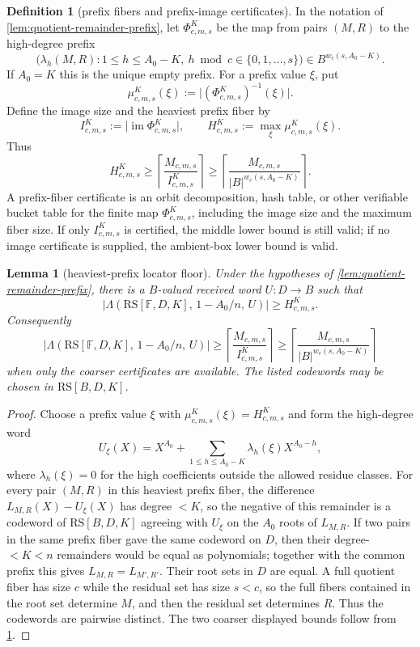 \documentclass[11pt]{article}
\newtheorem{lemma}[lemma]{Lemma}
\theoremstyle{definition}
\newtheorem{definition}[definition]{Definition}
\theoremstyle{remark}
\newcommand{\F}{\mathbb{F}}
\newcommand{\B}{B}
\newcommand{\RS}{\mathrm{RS}}
\newcommand{\Lst}{\Lambda}
\begin{document}
\begin{definition}[prefix fibers and prefix-image certificates]
\label{def:prefix-fiber-certificate}
In the notation of \cref{lem:quotient-remainder-prefix}, let
$\Phi_{c,m,s}^{K}$ be the map from pairs $(M,R)$ to the high-degree prefix
\[
        \bigl(\lambda_h(M,R):1\le h\le A_0-K,
              \ h\bmod c\in\{0,1,\ldots,s\}\bigr)
        \in \B^{w_c(s,A_0-K)} .
\]
If $A_0=K$ this is the unique empty prefix.  For a prefix value $\xi$, put
\[
        \mu_{c,m,s}^{K}(\xi)
        :=\bigl| (\Phi_{c,m,s}^{K})^{-1}(\xi)\bigr|.
\]
Define the image size and the heaviest prefix fiber by
\[
        I_{c,m,s}^{K}:=\bigl|\operatorname{im}\Phi_{c,m,s}^{K}\bigr|,
        \qquad
        H_{c,m,s}^{K}:=\max_{\xi}\mu_{c,m,s}^{K}(\xi).
\]
Thus
\[
        H_{c,m,s}^{K}
        \ge
        \left\lceil\frac{M_{c,m,s}}{I_{c,m,s}^{K}}\right\rceil
        \ge
        \left\lceil\frac{M_{c,m,s}}{|\B|^{w_c(s,A_0-K)}}\right\rceil .
\]
A prefix-fiber certificate is an orbit decomposition, hash table, or other
verifiable bucket table for the finite map $\Phi_{c,m,s}^{K}$, including the
image size and the maximum fiber size.  If only $I_{c,m,s}^{K}$ is certified,
the middle lower bound is still valid; if no image certificate is supplied, the
ambient-box lower bound is valid.
\end{definition}

\begin{lemma}[heaviest-prefix locator floor]
\label{lem:heaviest-prefix-locator-floor}
Under the hypotheses of \cref{lem:quotient-remainder-prefix}, there is a
$\B$-valued received word $U:D\to\B$ such that
\[
        \bigl|\Lst(\RS[\F,D,K],\,1-A_0/n,\,U)\bigr|
        \ge H_{c,m,s}^{K}.
\]
Consequently
\[
        \bigl|\Lst(\RS[\F,D,K],\,1-A_0/n,\,U)\bigr|
        \ge
        \left\lceil \frac{M_{c,m,s}}{I_{c,m,s}^{K}}\right\rceil
        \ge
        \left\lceil \frac{M_{c,m,s}}{|\B|^{w_c(s,A_0-K)}}\right\rceil
\]
when only the coarser certificates are available.  The listed codewords may be
chosen in $\RS[\B,D,K]$.
\end{lemma}

\begin{proof}
Choose a prefix value $\xi$ with
$\mu_{c,m,s}^{K}(\xi)=H_{c,m,s}^{K}$ and form the high-degree word
\[
        U_\xi(X)=X^{A_0}+\sum_{1\le h\le A_0-K}
        \lambda_h(\xi)X^{A_0-h},
\]
where $\lambda_h(\xi)=0$ for the high coefficients outside the allowed
residue classes.  For every pair $(M,R)$ in this heaviest prefix fiber, the difference
$L_{M,R}(X)-U_\xi(X)$ has degree $<K$, so the negative of this remainder is a
codeword of $\RS[\B,D,K]$ agreeing with $U_\xi$ on the $A_0$ roots of
$L_{M,R}$.  If two pairs in the same prefix fiber gave the same codeword on
$D$, then their degree-$<K<n$ remainders would be equal as polynomials; together
with the common prefix this gives $L_{M,R}=L_{M',R'}$.  Their root sets in $D$
are equal.  A full quotient fiber has size $c$ while the residual set has size
$s<c$, so the full fibers contained in the root set determine $M$, and then the
residual set determines $R$.  Thus the codewords are pairwise distinct.  The two
coarser displayed bounds follow from \cref{def:prefix-fiber-certificate}.
\end{proof}
\end{document}
